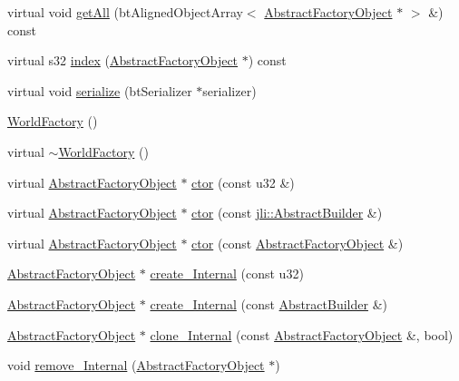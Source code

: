 \begin{DoxyCompactItemize}
\item 
virtual void \hyperlink{classjli_1_1_world_factory_afc3c3ab16e547f8efb70df6c0a6c9acc}{get\+All} (bt\+Aligned\+Object\+Array$<$ \hyperlink{classjli_1_1_abstract_factory_object}{Abstract\+Factory\+Object} $\ast$ $>$ \&) const 
\item 
virtual s32 \hyperlink{classjli_1_1_world_factory_a36ed5d3e23a486003b5490dbd117c308}{index} (\hyperlink{classjli_1_1_abstract_factory_object}{Abstract\+Factory\+Object} $\ast$) const 
\item 
virtual void \hyperlink{classjli_1_1_world_factory_a4cb7bc0a2b06508944575416716a2630}{serialize} (bt\+Serializer $\ast$serializer)
\item 
\hyperlink{classjli_1_1_world_factory_aa0743bb8d687c225a725d68360c84cee}{World\+Factory} ()
\item 
virtual \hyperlink{classjli_1_1_world_factory_ab07df554e2f6d0777470dc426020ceeb}{$\sim$\+World\+Factory} ()
\item 
virtual \hyperlink{classjli_1_1_abstract_factory_object}{Abstract\+Factory\+Object} $\ast$ \hyperlink{classjli_1_1_world_factory_a1651da687bf991ffafa8f02bc3eb9707}{ctor} (const u32 \&)
\item 
virtual \hyperlink{classjli_1_1_abstract_factory_object}{Abstract\+Factory\+Object} $\ast$ \hyperlink{classjli_1_1_world_factory_a0b8a82380ee533205802acb2c58af331}{ctor} (const \hyperlink{classjli_1_1_abstract_builder}{jli\+::\+Abstract\+Builder} \&)
\item 
virtual \hyperlink{classjli_1_1_abstract_factory_object}{Abstract\+Factory\+Object} $\ast$ \hyperlink{classjli_1_1_world_factory_a62f73f5ea8689adf2652de1111f05915}{ctor} (const \hyperlink{classjli_1_1_abstract_factory_object}{Abstract\+Factory\+Object} \&)
\item 
\hyperlink{classjli_1_1_abstract_factory_object}{Abstract\+Factory\+Object} $\ast$ \hyperlink{classjli_1_1_world_factory_a950011f467778776bffd2fe0a149293a}{create\+\_\+\+Internal} (const u32)
\item 
\hyperlink{classjli_1_1_abstract_factory_object}{Abstract\+Factory\+Object} $\ast$ \hyperlink{classjli_1_1_world_factory_a0bbb3e37df86e691253179a12bdc191d}{create\+\_\+\+Internal} (const \hyperlink{classjli_1_1_abstract_builder}{Abstract\+Builder} \&)
\item 
\hyperlink{classjli_1_1_abstract_factory_object}{Abstract\+Factory\+Object} $\ast$ \hyperlink{classjli_1_1_world_factory_aa0f13c33f5e308f48ef1db874bc897fb}{clone\+\_\+\+Internal} (const \hyperlink{classjli_1_1_abstract_factory_object}{Abstract\+Factory\+Object} \&, bool)
\item 
void \hyperlink{classjli_1_1_world_factory_ac3348faaa06a437c9bdff93f0245d1e1}{remove\+\_\+\+Internal} (\hyperlink{classjli_1_1_abstract_factory_object}{Abstract\+Factory\+Object} $\ast$)
\end{DoxyCompactItemize}
